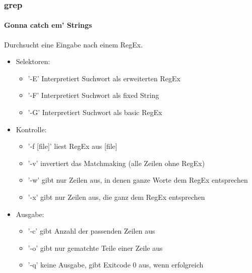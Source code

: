 \documentclass[12pt,utf8, handout]{beamer}
\begin{document}
\begin{frame}
\frametitle{grep}
\framesubtitle{Gonna catch em' Strings}
Durchsucht eine Eingabe nach einem RegEx.
\begin{itemize}[<+->]
	\item Selektoren:
	\begin{itemize}[<+->]
		\item '-E' Interpretiert Suchwort als erweiterten RegEx
		\item '-F' Interpretiert Suchwort als fixed String
		\item '-G' Interpretiert Suchwort als basic RegEx
	\end{itemize}
	\item Kontrolle:
	\begin{itemize}
		\item '-f [file]' liest RegEx aus [file]
		\item '-v' invertiert das Matchmaking (alle Zeilen ohne RegEx)
		\item '-w' gibt nur Zeilen aus, in denen ganze Worte dem RegEx entsprechen
		\item '-x' gibt nur Zeilen aus, die ganz dem RegEx entsprechen
	\end{itemize}
	\item Ausgabe:
	\begin{itemize}
		\item '-c' gibt Anzahl der passenden Zeilen aus
		\item '-o' gibt nur gematchte Teile einer Zeile aus
		\item '-q' keine Ausgabe, gibt Exitcode 0 aus, wenn erfolgreich
	\end{itemize}
\end{itemize}
\end{frame}
\end{document}

